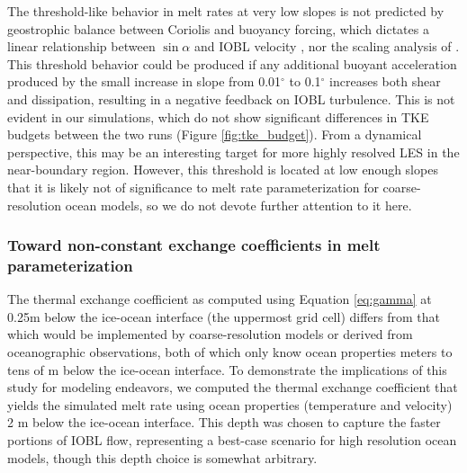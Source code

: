 \documentclass[draft]{agujournal2019}
\begin{document}
The threshold-like behavior in melt rates at very low slopes is not predicted by geostrophic balance between Coriolis and buoyancy forcing, which dictates a linear relationship between $\sin\alpha$ and IOBL velocity \cite{jenkins_simple_2016}, nor the scaling analysis of . This threshold behavior could be produced if any additional buoyant acceleration produced by the small increase in slope from 0.01$^{\circ}$ to 0.1$^{\circ}$ increases both shear and dissipation, resulting in a negative feedback on IOBL turbulence. This is not evident in our simulations, which do not show significant differences in TKE budgets between the two runs (Figure \ref{fig:tke_budget}). From a dynamical perspective, this may be an interesting target for more highly resolved LES in the near-boundary region. However, this threshold is located at low enough slopes that it is likely not of significance to melt rate parameterization for coarse-resolution ocean models, so we do not devote further attention to it here. 


\subsubsection{Toward non-constant exchange coefficients in melt parameterization}\label{disc:prm_gamma}

The thermal exchange coefficient as computed using Equation \ref{eq:gamma} at 0.25m below the ice-ocean interface (the uppermost grid cell) differs from that which would be implemented by coarse-resolution models or derived from oceanographic observations, both of which only know ocean properties meters to tens of m below the ice-ocean interface. To demonstrate the implications of this study for modeling endeavors, we computed the thermal exchange coefficient that yields the simulated melt rate using ocean properties (temperature and velocity) 2 m below the ice-ocean interface. This depth was chosen to capture the faster portions of IOBL flow, representing a best-case scenario for high resolution ocean models, though this depth choice is somewhat arbitrary. 
\end{document}
